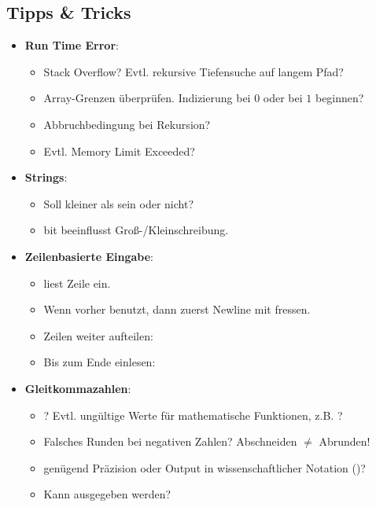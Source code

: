 \columnbreak
\subsection{Tipps \& Tricks}

\begin{itemize}
	\item \textbf{Run Time Error}:
	\begin{itemize}
		\item Stack Overflow? Evtl. rekursive Tiefensuche auf langem Pfad?
		\item Array-Grenzen überprüfen. Indizierung bei $0$ oder bei $1$ beginnen?
		\item Abbruchbedingung bei Rekursion?
		\item Evtl. Memory Limit Exceeded?
	\end{itemize}
	
	\item \textbf{Strings}:
	\begin{itemize}
		\item Soll  kleiner als  sein oder nicht?
		\item bit  beeinflusst Groß-/Kleinschreibung.
	\end{itemize}
	
	\item \textbf{Zeilenbasierte Eingabe}:
	\begin{itemize}
		\item {} liest Zeile ein.
		\item Wenn vorher  benutzt, dann zuerst Newline mit  fressen.
		\item Zeilen weiter aufteilen: 
		\item Bis zum Ende einlesen: 
	\end{itemize}

	\item \textbf{Gleitkommazahlen}:
	\begin{itemize}
		\item {}? Evtl. ungültige Werte für mathematische Funktionen, z.B. \mbox{}?
		\item Falsches Runden bei negativen Zahlen? Abschneiden $\neq$ Abrunden!
		\item genügend Präzision oder Output in wissenschaftlicher Notation ()?
		\item Kann  ausgegeben werden?
	\end{itemize}


\end{itemize}

